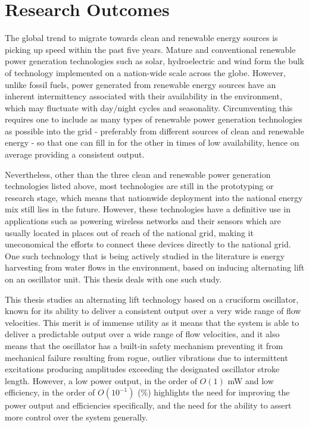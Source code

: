 \documentclass[oneside]{utmthesis}
\begin{document}
\section{Research Outcomes} \label{sec:concResearchOutcome}
The global trend to migrate towards clean and renewable energy sources is picking up speed within the past five years. Mature and conventional renewable power generation technologies such as solar, hydroelectric and wind form the bulk of technology implemented on a nation-wide scale across the globe. However, unlike fossil fuels, power generated from renewable energy sources have an inherent intermittency associated with their availability in the environment, which may fluctuate with day/night cycles and seasonality. Circumventing this requires one to include as many types of renewable power generation technologies as possible into the grid - preferably from different sources of clean and renewable energy - so that one can fill in for the other in times of low availability, hence on average providing a consistent output.

Nevertheless, other than the three clean and renewable power generation technologies listed above, most technologies are still in the prototyping or research stage, which means that nationwide deployment into the national energy mix still lies in the future. However, these technologies have a definitive use in applications such as powering wireless networks and their sensors which are usually located in places out of reach of the national grid, making it uneconomical the efforts to connect these devices directly to the national grid. One such technology that is being actively studied in the literature is energy harvesting from water flows in the environment, based on inducing alternating lift on an oscillator unit. This thesis deals with one such study.

This thesis studies an alternating lift technology based on a cruciform oscillator, known for its ability to deliver a consistent output over a very wide range of flow velocities. This merit is of immense utility as it means that the system is able to deliver a predictable output over a wide range of flow velocities, and it also means that the oscillator has a built-in safety mechanism preventing it from mechanical failure resulting from rogue, outlier vibrations due to intermittent excitations producing amplitudes exceeding the designated oscillator stroke length. However, a low power output, in the order of $O(1)$ mW and low efficiency, in the order of $O(10^{-1})$ (\%) highlights the need for improving the power output and efficiencies specifically, and the need for the ability to assert more control over the system generally.
\end{document}

